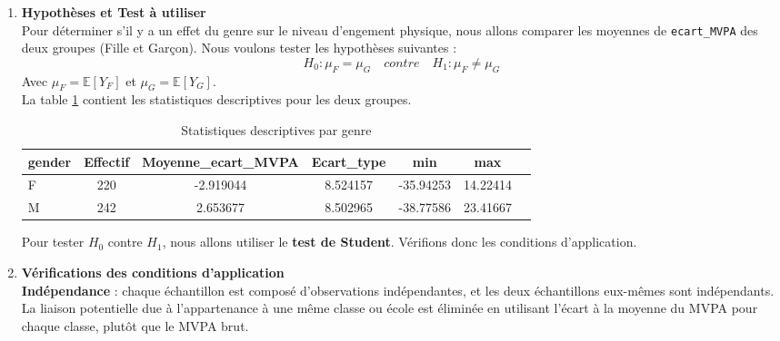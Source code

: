 \documentclass[12pt,a4paper]{article}
\begin{document}
\noindent
\begin{enumerate}[label=\textbf{\alph*})]
	\item \textbf{Hypothèses et Test à utiliser}  \\
	
	Pour déterminer s'il y a un effet du genre sur le niveau d'engement physique, nous allons comparer les moyennes de \texttt{ecart\_MVPA} des deux groupes (Fille et Garçon). Nous voulons tester les hypothèses suivantes : 
	\begin{equation*}
		H_0 : \mu_F = \mu_G \quad contre \quad H_1 : \mu_F \neq \mu_G
	\end{equation*}
	Avec $\mu_F = \mathbb{E}[Y_F]$ et $\mu_G = \mathbb{E}[Y_G]$.\\
	
	 La table \ref{tab:desc_stats_genre} contient les statistiques descriptives pour les deux groupes.
	\begin{table}[H]
		\centering
		\caption{Statistiques descriptives par genre}
		\begin{tabular}{lcccccc}
			\toprule
			\textbf{gender} & \textbf{Effectif} & \textbf{Moyenne\_ecart\_MVPA} & \textbf{Ecart\_type} & \textbf{min} & \textbf{max} \\
			\midrule
			F & \multicolumn{1}{c}{220} & \multicolumn{1}{c}{-2.919044} & \multicolumn{1}{c}{8.524157} & \multicolumn{1}{c}{-35.94253} & \multicolumn{1}{c}{14.22414} \\
			M & \multicolumn{1}{c}{242} & \multicolumn{1}{c}{2.653677} & \multicolumn{1}{c}{8.502965} & \multicolumn{1}{c}{-38.77586} & \multicolumn{1}{c}{23.41667} \\
			\bottomrule
		\end{tabular}
		\label{tab:desc_stats_genre}
	\end{table}
	
	Pour tester $H_0$ contre $H_1$, nous allons utiliser le \textbf{test de Student}. Vérifions donc les conditions d'application.\\
	
\noindent
\item \textbf{Vérifications des conditions d'application} \\

\noindent
\textbf{Indépendance} : chaque échantillon est composé d'observations indépendantes, et les deux échantillons eux-mêmes sont indépendants. La liaison potentielle due à l'appartenance à une même classe ou école est éliminée en utilisant l'écart à la moyenne du MVPA pour chaque classe, plutôt que le MVPA brut.\\


\end{enumerate}
\end{document}
